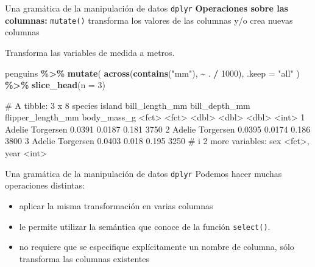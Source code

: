\documentclass[
  ignorenonframetext,
  aspectratio=169]{beamer}
\newenvironment{Shaded}{\begin{snugshade}}{\end{snugshade}}
\newcommand{\AttributeTok}[1]{\textcolor[rgb]{0.13,0.29,0.53}{#1}}
\newcommand{\DecValTok}[1]{\textcolor[rgb]{0.00,0.00,0.81}{#1}}
\newcommand{\FunctionTok}[1]{\textcolor[rgb]{0.13,0.29,0.53}{\textbf{#1}}}
\newcommand{\NormalTok}[1]{#1}
\newcommand{\SpecialCharTok}[1]{\textcolor[rgb]{0.81,0.36,0.00}{\textbf{#1}}}
\newcommand{\StringTok}[1]{\textcolor[rgb]{0.31,0.60,0.02}{#1}}
\providecommand{\tightlist}{%
  \setlength{\itemsep}{0pt}\setlength{\parskip}{0pt}}
\let\oldverbatim\verbatim
\let\endoldverbatim\endverbatim
\renewenvironment{verbatim}{\tiny\oldverbatim}{\endoldverbatim}
\begin{document}
\begin{frame}[fragile]{Una gramática de la manipulación de datos
\texttt{dplyr}}
\label{una-gramuxe1tica-de-la-manipulaciuxf3n-de-datos-dplyr-26}
\textbf{Operaciones sobre las columnas:} \texttt{mutate()} transforma
los valores de las columnas y/o crea nuevas columnas

Transforma las variables de medida a metros.

\begin{Shaded}
\begin{Highlighting}[]
\NormalTok{penguins }\SpecialCharTok{\%\textgreater{}\%} 
  \FunctionTok{mutate}\NormalTok{(}
    \FunctionTok{across}\NormalTok{(}\FunctionTok{contains}\NormalTok{(}\StringTok{"mm"}\NormalTok{), }\SpecialCharTok{\textasciitilde{}}\NormalTok{ . }\SpecialCharTok{/} \DecValTok{1000}\NormalTok{),}
    \AttributeTok{.keep =} \StringTok{"all"}
\NormalTok{  ) }\SpecialCharTok{\%\textgreater{}\%} 
  \FunctionTok{slice\_head}\NormalTok{(}\AttributeTok{n =} \DecValTok{3}\NormalTok{)}
\end{Highlighting}
\end{Shaded}

\begin{verbatim}
# A tibble: 3 x 8
  species island    bill_length_mm bill_depth_mm flipper_length_mm body_mass_g
  <fct>   <fct>              <dbl>         <dbl>             <dbl>       <int>
1 Adelie  Torgersen         0.0391        0.0187             0.181        3750
2 Adelie  Torgersen         0.0395        0.0174             0.186        3800
3 Adelie  Torgersen         0.0403        0.018              0.195        3250
# i 2 more variables: sex <fct>, year <int>
\end{verbatim}
\end{frame}

\begin{frame}[fragile]{Una gramática de la manipulación de datos
\texttt{dplyr}}
\label{una-gramuxe1tica-de-la-manipulaciuxf3n-de-datos-dplyr-27}
Podemos hacer muchas operaciones distintas:

\begin{itemize}
\tightlist
\item
  aplicar la misma transformación en varias columnas
\item
  le permite utilizar la semántica que conoce de la función
  \texttt{select()}.
\item
  no requiere que se especifique explícitamente un nombre de columna,
  sólo transforma las columnas existentes
\end{itemize}
\end{frame}
\end{document}

